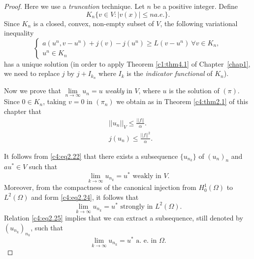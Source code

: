  \begin{proof}
Here we use a {\em truncation} technique. Let $n$ be a positive integer. Define
$$
K_n \{ v \in V : |v (x)| \leq n a.e. \}.
$$
 Since $K_n$ is a closed, convex, non-empty subset of $V$, the following variational inequality
 \begin{equation}
\begin{cases}
a (u^n, v-u^n) + j (v) - j (u^n) \geq L (v -u^n) \ \forall v \in K_n,\\
u^n \in K_n \tag{$\pi_n$}
\end{cases}
 \end{equation}\pageoriginale 
 has a unique solution (in order to apply Theorem \ref{c1:thm4.1} of 
 Chapter~\ref{chap1}, we need to replace $j$ by $j+I_{k_n}$ where $I_k$ is the \textit{indicator functional} of $K_n$).
   
Now we prove that $\lim\limits_{n \to \infty} u_n = u$ \textit{weakly} 
in $V$, where $u$ is the solution of $(\pi)$. Since $ 0 \in K_n$, 
taking $v = 0$ in $(\pi_n)$ we obtain as in Theorem \ref{c4:thm2.1} of this chapter that
 \begin{align}
& || u_n ||_V \leq \frac{||f||}{\alpha}. \tag{2.22}\label{c4:eq2.22}\\
& j (u_n) \leq \frac{|| f ||^2}{\alpha}. \tag{2.23}\label{c4:eq2.23}
\end{align} 
 
It follows from \eqref{c4:eq2.22} that there exists a subsequence $\{u_{n_k}\}$ of $(u_n)_n$ and $a u^* \in V$ such that
 \begin{equation}
\lim_{k \to \infty} u_{n_k} = u^* \text{ weakly in } V. \tag{2.24}\label{c4:eq2.24} 
 \end{equation} 
 Moreover, from the compactness of the canonical injection from $H^1_0 (\Omega)$ to $L^2 (\Omega)$ and form \eqref{c4:eq2.24}, it follows that
 \begin{equation}
\lim_{k \to \infty} u_{n_k} = u^* \text{ strongly in } L^2
(\Omega).\tag{2.25}\label{c4:eq2.25} 
\end{equation} 
 Relation \eqref{c4:eq2.25} implies that we can extract a subsequence,
 still denoted by $(u_{n_k})_{n_k}$, such that 
 \begin{equation}
\lim_{k \to \infty} u_{n_k} = u^* \text{ a. e. in } \Omega. \tag{2.26}\label{c4:eq2.26}
 \end{equation} 
 

\end{proof}
